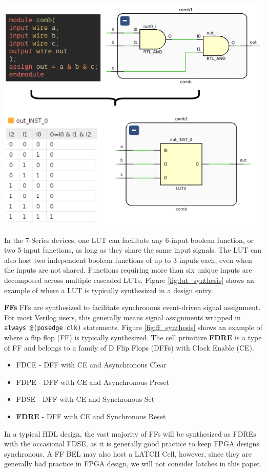 \documentclass{article}
\begin{document}
\begin{multicols}{2}
        {
            \centering
            \includegraphics[width=\columnwidth]{figures/lut_synthesis.png}
            \label{fig:lut_synthesis}
        }
        \vspace{1.0cm}

        In the 7‑Series devices, one LUT can facilitate any 6-input boolean function, or two 5-input functions, as long as they share the same input signals.  
        The LUT can also host two independent boolean functions of up to 3 inputs each, even when the inputs are not shared.  
        Functions requiring more than six unique inputs are decomposed across multiple cascaded LUTs.
        Figure \ref{fig:lut_synthesis} shows an example of where a LUT is typically synthesized in a design entry. 


    \textbf{FFs} \quad
        FFs are synthesized to facilitate synchronous event-driven signal assignment. 
        For most Verilog users, this generally means signal assignments wrapped in \texttt{always @(posedge clk)} statements. 
        Figure \ref{fig:ff_synthesis} shows an example of where a flip flop (FF) is typically synthesized. 
        The cell primitive \textbf{FDRE} is a type of FF and belongs to a family of D Flip Flops (DFFs) with Clock Enable (CE). 
        \begin{itemize}
            \item FDCE - DFF with CE and Asynchronous Clear
            \item FDPE - DFF with CE and Asynchronous Preset
            \item FDSE - DFF with CE and Synchronous Set
            \item \textbf{FDRE} - DFF with CE and Synchronous Reset
        \end{itemize}
        In a typical HDL design, the vast majority of FFs will be synthesized as FDREs with the occasional FDSE, as it is generally good practice to keep FPGA designs synchronous. 
        A FF BEL may also host a LATCH Cell, however, since they are generally bad practice in FPGA design, we will not consider latches in this paper. 


\end{multicols}
\end{document}
